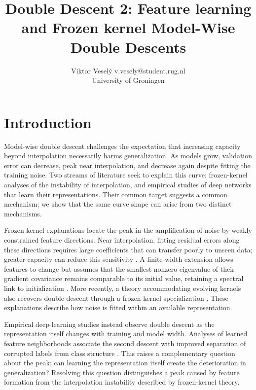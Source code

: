 \documentclass[10pt]{article} %
\title{Double Descent 2: Feature learning and Frozen kernel Model-Wise Double Descents}
\author{\name Viktor Vesel\'{y} \email v.vesely@student.rug.nl \\
\addr University of Groningen
}
\begin{document}
\maketitle

\begin{abstract}
\end{abstract}

\section{Introduction}

Model-wise double descent challenges the expectation that increasing capacity beyond interpolation necessarily harms generalization. As models grow, validation error can decrease, peak near interpolation, and decrease again despite fitting the training noise. Two streams of literature seek to explain this curve: frozen-kernel analyses of the instability of interpolation, and empirical studies of deep networks that learn their representations. Their common target suggests a common mechanism; we show that the same curve shape can arise from two distinct mechanisms.

Frozen-kernel explanations locate the peak in the amplification of noise by weakly constrained feature directions. Near interpolation, fitting residual errors along these directions requires large coefficients that can transfer poorly to unseen data; greater capacity can reduce this sensitivity \citep{bach2023highdimensionalanalysisdoubledescent,schaeffer2023doubledescentdemystifiedidentifying}. A finite-width extension allows features to change but assumes that the smallest nonzero eigenvalue of their gradient covariance remains comparable to its initial value, retaining a spectral link to initialization \citep{singh2022phenomenologydoubledescentfinitewidth}. More recently, a theory accommodating evolving kernels also recovers double descent through a frozen-kernel specialization \citep{litman2026theorygeneralizationdeeplearning}. These explanations describe how noise is fitted within an available representation.

Empirical deep-learning studies instead observe double descent as the representation itself changes with training and model width. Analyses of learned feature neighborhoods associate the second descent with improved separation of corrupted labels from class structure \citep{gu2024unravelingenigmadoubledescent}. This raises a complementary question about the peak: can learning the representation itself create the deterioration in generalization? Resolving this question distinguishes a peak caused by feature formation from the interpolation instability described by frozen-kernel theory.
\end{document}
